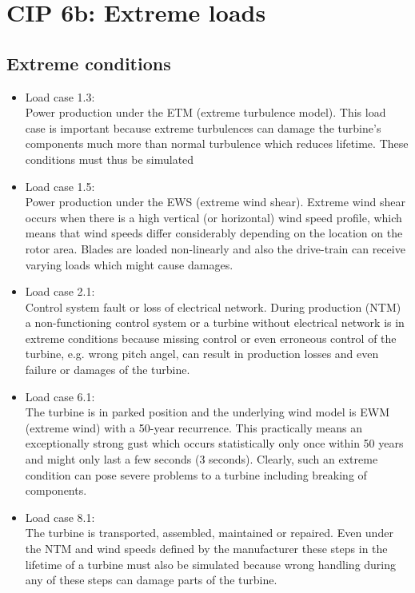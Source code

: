\documentclass[10pt]{article}
\begin{document}
\section{CIP 6b: Extreme loads}
\subsection{Extreme conditions}
\begin{itemize}
\item Load case 1.3: \\
	Power production under the ETM (extreme turbulence model). This load case is important because extreme turbulences can damage the turbine's components much more than normal turbulence which reduces lifetime. These conditions must thus be simulated 
\item Load case 1.5: \\
	Power production under the EWS (extreme wind shear). Extreme wind shear occurs when there is a high vertical (or horizontal) wind speed profile, which means that wind speeds differ considerably depending on the location on the rotor area. Blades are loaded non-linearly and also the drive-train can receive varying loads which might cause damages.
\item Load case 2.1: \\
	Control system fault or loss of electrical network. During production (NTM) a non-functioning control system or a turbine without electrical network is in extreme conditions because missing control or even erroneous control of the turbine, e.g. wrong pitch angel, can result in production losses and even failure or damages of the turbine.
\item Load case 6.1: \\
	The turbine is in parked position and the underlying wind model is EWM (extreme wind) with a 50-year recurrence. This practically means an exceptionally strong gust which occurs statistically only once within 50 years and might only last a few seconds (3 seconds). Clearly, such an extreme condition can pose severe problems to a turbine including breaking of components.
\item Load case 8.1: \\
	The turbine is transported, assembled, maintained or repaired. Even under the NTM and wind speeds defined by the manufacturer these steps in the lifetime of a turbine must also be simulated because wrong handling during any of these steps can damage parts of the turbine.
\end{itemize}
\end{document}
